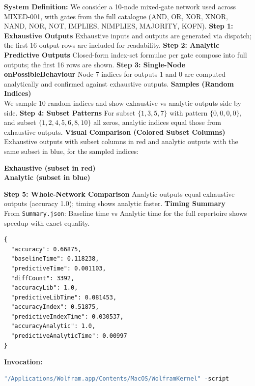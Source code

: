 \textbf{System Definition:} We consider a 10-node mixed-gate network used across MIXED-001, with gates from the full catalogue (AND, OR, XOR, XNOR, NAND, NOR, NOT, IMPLIES, NIMPLIES, MAJORITY, KOFN).
\textbf{Step 1: Exhaustive Outputs}
Exhaustive inputs and outputs are generated via dispatch; the first 16 output rows are included for readability.
\textbf{Step 2: Analytic Predictive Outputs}
Closed-form index-set formulae per gate compose into full outputs; the first 16 rows are shown.
\textbf{Step 3: Single-Node onPossibleBehaviour}
Node 7 indices for outputs 1 and 0 are computed analytically and confirmed against exhaustive outputs.
\textbf{Samples (Random Indices)}\\ We sample 10 random indices and show exhaustive vs analytic outputs side-by-side.
\textbf{Step 4: Subset Patterns}
For subset \(\{1,3,5,7\}\) with pattern \(\{0,0,0,0\}\), and subset \(\{1,2,4,5,6,8,10\}\) all zeros, analytic indices equal those from exhaustive outputs.
\textbf{Visual Comparison (Colored Subset Columns)}\\ Exhaustive outputs with subset columns in red and analytic outputs with the same subset in blue, for the sampled indices:
\begin{center}
\textbf{Exhaustive (subset in red)}
\\[0.5em]
\textbf{Analytic (subset in blue)}
\end{center}
\textbf{Step 5: Whole-Network Comparison}
Analytic outputs equal exhaustive outputs (accuracy 1.0); timing shows analytic faster.
\textbf{Timing Summary}\\ From \texttt{Summary.json}: Baseline time vs Analytic time for the full repertoire shows speedup with exact equality.
\begin{lstlisting}[language={}]
{
  "accuracy": 0.66875,
  "baselineTime": 0.118238,
  "predictiveTime": 0.001103,
  "diffCount": 3392,
  "accuracyLib": 1.0,
  "predictiveLibTime": 0.081453,
  "accuracyIndex": 0.51875,
  "predictiveIndexTime": 0.030537,
  "accuracyAnalytic": 1.0,
  "predictiveAnalyticTime": 0.00997
}
\end{lstlisting}
\textbf{Invocation:}
\begin{lstlisting}[language=Mathematica]
"/Applications/Wolfram.app/Contents/MacOS/WolframKernel" -script 
\end{lstlisting}

